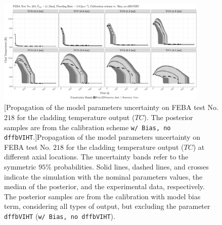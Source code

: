 \clearpage
\begin{figure}
	\centering
	\includegraphics[width=0.90\textwidth]{../figures/chapter5/figures/plotTraceUQPosteriorAllDiscCenteredNoParam8TC218}
		[Propagation of the model parameters uncertainty on FEBA test No. $218$ for the cladding temperature output ($TC$). The posterior samples are from the calibration scheme \texttt{w/ Bias, no dffbVIHT}.]{Propagation of the model parameters uncertainty on FEBA test No. $218$ for the cladding temperature output ($TC$) at different axial locations. The uncertainty bands refer to the symmetric $95\%$ probabilities. Solid lines, dashed lines, and crosses indicate the simulation with the nominal parameters values, the median of the posterior, and the experimental data, respectively. The posterior samples are from the calibration with model bias term, considering all types of output, but excluding the parameter \texttt{dffbVIHT} (\texttt{w/ Bias, no dffbVIHT}).}
	\label{fig:ch5_plot_trace_uq_post_tc_218_noparam8}
\end{figure}
\clearpage


